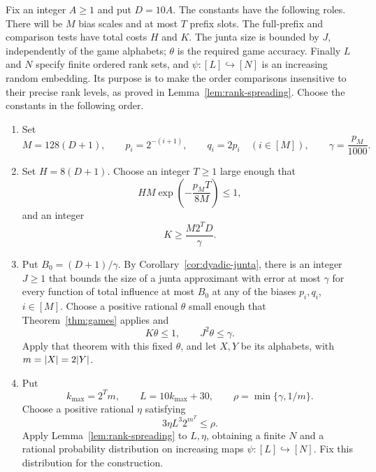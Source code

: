 Fix an integer $A\ge 1$ and put $D=10A$. The constants have the following
roles. There will be $M$ bias scales and at most $T$ prefix slots.
The full-prefix and comparison tests have total costs $H$ and $K$.
The junta size is bounded by $J$, independently of the game alphabets;
$\theta$ is the required game accuracy. Finally $L$ and $N$ specify
finite ordered rank sets, and $\psi:[L]\hookrightarrow[N]$ is an
increasing random embedding. Its purpose is to make the order
comparisons insensitive to their precise rank levels, as proved in
Lemma~\ref{lem:rank-spreading}.
Choose the constants in the following order.
\begin{enumerate}[label=\arabic*.]
  \item Set
  \[
    M=128(D+1),\qquad
    p_i=2^{-(i+1)},\qquad q_i=2p_i\quad (i\in[M]),
    \qquad \gamma=\frac{p_M}{1000}.
  \]
  \item Set $H=8(D+1)$.  Choose an integer $T\ge 1$ large enough that
  \begin{equation}
    HM\exp\left(-\frac{p_MT}{8M}\right)\le 1,
    \label{eq:prefix-length-choice}
  \end{equation}
  and an integer
  \begin{equation}
    K\ge \frac{M2^T D}{\gamma}.
    \label{eq:comparison-mass-choice}
  \end{equation}
  \item Put $B_0=(D+1)/\gamma$.  By Corollary~\ref{cor:dyadic-junta}, there
  is an integer $J\ge 1$ that bounds the size of a junta approximant with
  error at most $\gamma$ for every function of total influence at most $B_0$
  at any of the biases $p_i,q_i$, $i\in[M]$.  Choose a positive rational
  $\theta$ small enough that Theorem~\ref{thm:games} applies and
  \begin{equation}
    K\theta\le 1,\qquad J^2\theta\le\gamma.
    \label{eq:game-accuracy-choice}
  \end{equation}
  Apply that theorem with this fixed $\theta$, and let $X,Y$ be its
  alphabets, with $m=\lvert X\rvert=2\lvert Y\rvert$.
  \item Put
  \[
    k_{\max}=2^Tm,\qquad L=10k_{\max}+30,
    \qquad \rho=\min\{\gamma,1/m\}.
  \]
  Choose a positive rational $\eta$ satisfying
  \begin{equation}
    3\eta L^3 2^{m^T}\le\rho.
    \label{eq:rank-accuracy-choice}
  \end{equation}
  Apply Lemma~\ref{lem:rank-spreading} to $L,\eta$, obtaining a finite $N$
  and a rational probability distribution on increasing maps
  $\psi:[L]\hookrightarrow[N]$.  Fix this distribution for the construction.
\end{enumerate}

